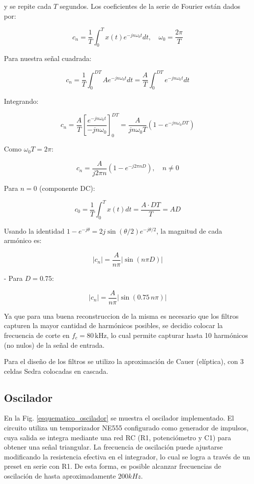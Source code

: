 y se repite cada $T$ segundos.
Los coeficientes de la serie de Fourier están dados por:

\[
c_n = \frac{1}{T} \int_0^T x(t) e^{-j n \omega_0 t} dt, \quad \omega_0 = \frac{2 \pi}{T}
\]

Para nuestra señal cuadrada:

\[
c_n = \frac{1}{T} \int_0^{D T} A e^{-j n \omega_0 t} dt
= \frac{A}{T} \int_0^{D T} e^{-j n \omega_0 t} dt
\]

Integrando:

\[
c_n = \frac{A}{T} \left[ \frac{e^{-j n \omega_0 t}}{-j n \omega_0} \right]_0^{D T}
= \frac{A}{j n \omega_0 T} \left( 1 - e^{-j n \omega_0 D T} \right)
\]

Como $\omega_0 T = 2 \pi$:

\[
c_n = \frac{A}{j 2 \pi n} \left( 1 - e^{-j 2 \pi n D} \right), \quad n \neq 0
\]

Para $n = 0$ (componente DC):

\[
c_0 = \frac{1}{T} \int_0^T x(t) dt = \frac{A \cdot D T}{T} = A D
\]



Usando la identidad $1 - e^{-j \theta} = 2 j \sin(\theta/2) e^{-j \theta/2}$, la magnitud de cada armónico es:

\[
|c_n| = \frac{A}{n \pi} \left| \sin(n \pi D) \right|
\]

- Para $D = 0.75$:

\[
|c_n| = \frac{A}{n \pi} \left| \sin(0.75 \, n \pi) \right|
\]

Ya que para una buena reconstruccion de la misma es necesario que los filtros
capturen la mayor cantidad de harmónicos posibles, se decidio colocar
la frecuencia de corte en $f_c = 80 \,\text{kHz}$, lo cual permite capturar 
hasta 10 harmónicos (no nulos) de la señal de entrada.

Para el diseño de los filtros se utilizo la aproximación de Cauer (elíptica), 
con 3 celdas Sedra colocadas en cascada.

\subsection{Oscilador}
En la Fig. \ref{esquematico_oscilador} se muestra el oscilador implementado. El circuito utiliza un temporizador NE555 configurado como generador de impulsos, cuya salida se integra mediante una red RC (R1, potenciómetro y C1) para obtener una señal triangular. La frecuencia de oscilación puede ajustarse modificando la resistencia efectiva en el integrador, lo cual se logra a través de un preset en serie con R1. De esta forma, es posible alcanzar frecuencias de oscilación de hasta aproximadamente $200kHz$.

